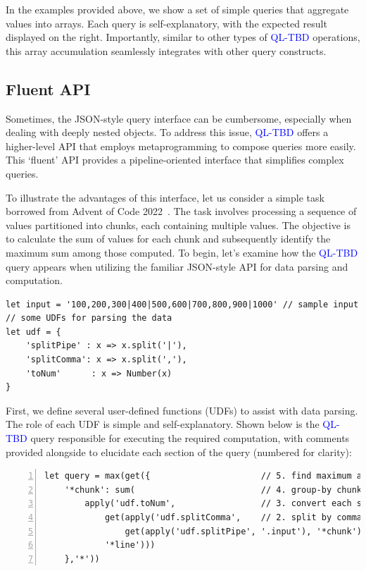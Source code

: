 \documentclass[runningheads]{llncs}
\newcommand{\lang}{\textcolor{blue}{QL-TBD}}
\begin{document}
In the examples provided above, we show a set of simple queries that aggregate values
into arrays.
Each query is self-explanatory, with the expected result displayed on the right.
Importantly, similar to other types of \lang{} operations, this array accumulation
seamlessly integrates with other query constructs.

\subsection{Fluent API}
Sometimes, the JSON-style query interface can be cumbersome,
especially when dealing with deeply nested objects.
To address this issue, \lang{} offers a higher-level API that employs
metaprogramming to compose queries more easily.
This `fluent' API provides a pipeline-oriented interface that
simplifies complex queries.

To illustrate the advantages of this interface, let us consider a
simple task borrowed from Advent of Code 2022~\cite{adventofcode22}.
The task involves processing a sequence of values partitioned into chunks,
each containing multiple values.
The objective is to calculate the sum of values for each chunk and
subsequently identify the maximum sum among those computed.
To begin, let's examine how the \lang{} query appears when utilizing
the familiar JSON-style API for data parsing and computation.


\begin{lstlisting}[style=JavaScript, columns=flexible]
let input = '100,200,300|400|500,600|700,800,900|1000' // sample input
// some UDFs for parsing the data
let udf = {
    'splitPipe' : x => x.split('|'),
    'splitComma': x => x.split(','),
    'toNum'      : x => Number(x)
}
\end{lstlisting}

First, we define several user-defined functions (UDFs) to assist with data parsing.
The role of each UDF is simple and self-explanatory.
Shown below is the \lang{} query responsible for executing the required
computation, with comments provided alongside to elucidate each section
of the query (numbered for clarity):

\begin{lstlisting}[style=JavaScript, columns=flexible, numbers=left]
let query = max(get({                      // 5. find maximum among group sums
    '*chunk': sum(                         // 4. group-by chunk and compute sum
        apply('udf.toNum',                 // 3. convert each string number to a number object
            get(apply('udf.splitComma',    // 2. split by comma to get numbers of each chunk
                get(apply('udf.splitPipe', '.input'), '*chunk')), // 1. split into chunks
            '*line')))
    },'*'))
\end{lstlisting}
\end{document}
